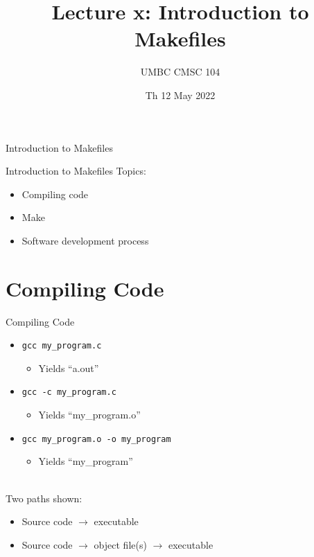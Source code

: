 \documentclass[graphics]{beamer}
\title{Lecture x: Introduction to Makefiles}
\author{UMBC CMSC 104}
\date{Th 12 May 2022}
\begin{document}
\begin{frame}{}
\centering
    Introduction to Makefiles
\end{frame}

\begin{frame}{Introduction to Makefiles}
    Topics:
    \begin{itemize}
        \item Compiling code
        \item Make
        \item Software development process
    \end{itemize}
\end{frame}

\section*{Compiling Code}
\begin{frame}{Compiling Code}
    \begin{itemize}
        \item \texttt{gcc my\_program.c}
        \begin{itemize}
            \item Yields ``a.out''
        \end{itemize}
        \item \texttt{gcc -c my\_program.c}
        \begin{itemize}
            \item Yields ``my\_program.o''
        \end{itemize}
        \item \texttt{gcc my\_program.o -o my\_program}
        \begin{itemize}
            \item Yields ``my\_program''
        \end{itemize}
    \end{itemize} ~~ \\
    Two paths shown:
    \begin{itemize}
        \item Source code $\rightarrow$ executable
        \item Source code $\rightarrow$ object file(s) $\rightarrow$ executable
    \end{itemize}
\end{frame}
\end{document}
